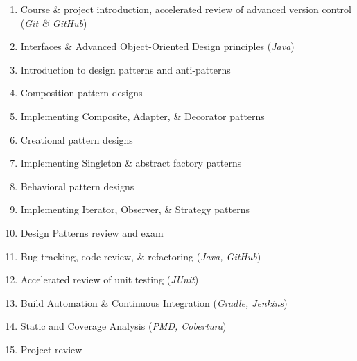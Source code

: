 \documentclass[12pt]{article}
\begin{document}
  \begin{enumerate}
    \item Course \& project introduction, accelerated review of advanced version control (\textit{Git \& GitHub})
    \item Interfaces \& Advanced Object-Oriented Design principles (\textit{Java})
    \item Introduction to design patterns and anti-patterns
    \item Composition pattern designs
    \item Implementing Composite, Adapter, \& Decorator patterns
    \item Creational pattern designs
    \item Implementing Singleton \& abstract factory patterns
    \item Behavioral pattern designs
    \item Implementing Iterator, Observer, \& Strategy patterns
    \item Design Patterns review and exam
    \item Bug tracking, code review, \& refactoring (\textit{Java, GitHub})
    \item Accelerated review of unit testing (\textit{JUnit})
    \item Build Automation \& Continuous Integration (\textit{Gradle, Jenkins})
    \item Static and Coverage Analysis (\textit{PMD, Cobertura})
    \item Project review
  \end{enumerate}
\end{document}
